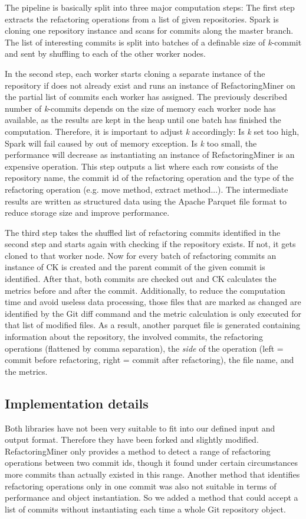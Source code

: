 The pipeline is basically split into three major computation steps: The first step extracts the refactoring operations from a list of given repositories. Spark is cloning one repository instance and scans for commits along the master branch. The list of interesting commits is split into batches of a definable size of \emph{k}-commit and sent by shuffling to each of the other worker nodes.

In the second step, each worker starts cloning a separate instance of the repository if does not already exist and runs an instance of RefactoringMiner on the partial list of commits each worker has assigned. The previously described number of \emph{k}-commits depends on the size of memory each worker node has available, as the results are kept in the heap until one batch has finished the computation. Therefore, it is important to adjust \emph{k} accordingly: Is \emph{k} set too high, Spark will fail caused by out of memory exception. Is \emph{k} too small, the performance will decrease as instantiating an instance of RefactoringMiner is an expensive operation. This step outputs a list where each row consists of the repository name, the commit id of the refactoring operation and the type of the refactoring operation (e.g. move method, extract method...). The intermediate results are written as structured data using the Apache Parquet file format \cite{parquet} to reduce storage size and improve performance.

The third step takes the shuffled list of refactoring commits identified in the second step and starts again with checking if the repository exists. If not, it gets cloned to that worker node. Now for every batch of refactoring commits an instance of CK is created and the parent commit of the given commit is identified. After that, both commits are checked out and CK calculates the metrics before and after the commit. Additionally, to reduce the computation time and avoid useless data processing, those files that are marked as changed are identified by the Git diff command and the metric calculation is only executed for that list of modified files. As a result, another parquet file is generated containing information about the repository, the involved commits, the refactoring operations (flattened by comma separation), the \emph{side} of the operation (left = commit before refactoring, right = commit after refactoring), the file name, and the metrics.

\subsection{Implementation details}
Both libraries have not been very suitable to fit into our defined input and output format. Therefore they have been forked and slightly modified. RefactoringMiner only provides a method to detect a range of refactoring operations between two commit ids, though it found under certain circumstances more commits than actually existed in this range. Another method that identifies refactoring operations only in one commit was also not suitable in terms of performance and object instantiation. So we added a method that could accept a list of commits without instantiating each time a whole Git repository object. 

